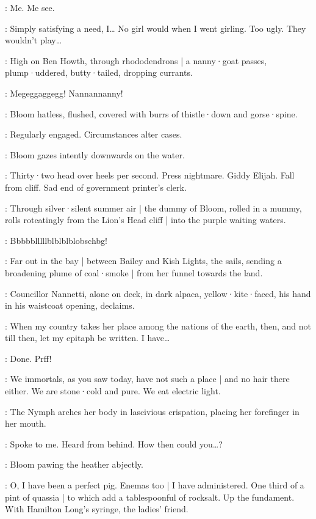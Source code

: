 \StaggeringBob:
Me.
Me see.

\Bloom:
Simply satisfying a need,
I…
No girl would when I went girling.
Too ugly.
They wouldn't play…

:
High on Ben Howth,
through rhododendrons |
a nanny·goat passes,
plump·uddered,
butty·tailed,
dropping currants.

\Nannygoat:
Megeggaggegg!
Nannannanny!

:
Bloom hatless,
flushed,
covered with burrs of thistle·down and gorse·spine.

\Bloom:
Regularly engaged.
Circumstances alter cases.

:
Bloom gazes intently downwards on the water.

\Bloom:
Thirty·two head over heels per second.
Press nightmare.
Giddy Elijah.
Fall from cliff.
Sad end of government printer's clerk.

:
Through silver·silent summer air |
the dummy of Bloom,
rolled in a mummy,
rolls roteatingly from the Lion's Head cliff |
into the purple waiting waters.

\Dummymummy:
Bbbbblllllblblblblobschbg!

:
Far out in the bay |
between Bailey and Kish Lights,
the  sails,
sending a broadening plume of coal·smoke |
from her funnel towards the land.

:
Councillor Nannetti,
alone on deck,
in dark alpaca,
yellow·kite·faced,
his hand in his waistcoat opening,
declaims.

\CouncillorNannetti:
When my country takes her place among the nations of the earth,
then,
and not till then,
let my epitaph be written.
I have…

\Bloom:
Done.
Prff!

\Nymph:
We immortals,
as you saw today,
have not such a place |
and no hair there either.
We are stone·cold and pure.
We eat electric light.

:
The Nymph arches her body in lascivious crispation,
placing her forefinger in her mouth.

\Nymph:
Spoke to me.
Heard from behind.
How then could you…?

:
Bloom pawing the heather abjectly.

\Bloom:
O,
I have been a perfect pig.
Enemas too |
I have administered.
One third of a pint of quassia |
to which add a tablespoonful of rocksalt.
Up the fundament.
With Hamilton Long's syringe,
the ladies' friend.%

